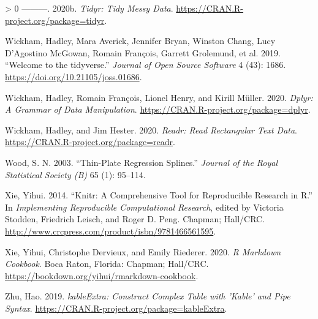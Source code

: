 \documentclass{article}
\newlength{\cslhangindent}
\newenvironment{CSLReferences}[3] %
 {%
  \setlength{\parindent}{0pt}
  \ifodd #1 \everypar{\setlength{\hangindent}{\cslhangindent}}\ignorespaces\fi
  \ifnum #2 > 0
  \setlength{\parskip}{#2\baselineskip}
  \fi
 }%
 {}
\begin{document}
\begin{CSLReferences}{1}{0}
\leavevmode\hypertarget{ref-tidyr}{}%
---------. 2020b. \emph{Tidyr: Tidy Messy Data}. \url{https://CRAN.R-project.org/package=tidyr}.

\leavevmode\hypertarget{ref-tidyverse}{}%
Wickham, Hadley, Mara Averick, Jennifer Bryan, Winston Chang, Lucy D'Agostino McGowan, Romain François, Garrett Grolemund, et al. 2019. {``Welcome to the {tidyverse}.''} \emph{Journal of Open Source Software} 4 (43): 1686. \url{https://doi.org/10.21105/joss.01686}.

\leavevmode\hypertarget{ref-dplyr}{}%
Wickham, Hadley, Romain François, Lionel Henry, and Kirill Müller. 2020. \emph{Dplyr: A Grammar of Data Manipulation}. \url{https://CRAN.R-project.org/package=dplyr}.

\leavevmode\hypertarget{ref-readr}{}%
Wickham, Hadley, and Jim Hester. 2020. \emph{Readr: Read Rectangular Text Data}. \url{https://CRAN.R-project.org/package=readr}.

\leavevmode\hypertarget{ref-mgcv}{}%
Wood, S. N. 2003. {``Thin-Plate Regression Splines.''} \emph{Journal of the Royal Statistical Society (B)} 65 (1): 95--114.

\leavevmode\hypertarget{ref-knitr}{}%
Xie, Yihui. 2014. {``Knitr: A Comprehensive Tool for Reproducible Research in {R}.''} In \emph{Implementing Reproducible Computational Research}, edited by Victoria Stodden, Friedrich Leisch, and Roger D. Peng. Chapman; Hall/CRC. \url{http://www.crcpress.com/product/isbn/9781466561595}.

\leavevmode\hypertarget{ref-rmarkdown}{}%
Xie, Yihui, Christophe Dervieux, and Emily Riederer. 2020. \emph{R Markdown Cookbook}. Boca Raton, Florida: Chapman; Hall/CRC. \url{https://bookdown.org/yihui/rmarkdown-cookbook}.

\leavevmode\hypertarget{ref-kableExtra}{}%
Zhu, Hao. 2019. \emph{kableExtra: Construct Complex Table with 'Kable' and Pipe Syntax}. \url{https://CRAN.R-project.org/package=kableExtra}.

\end{CSLReferences}



\end{document}
